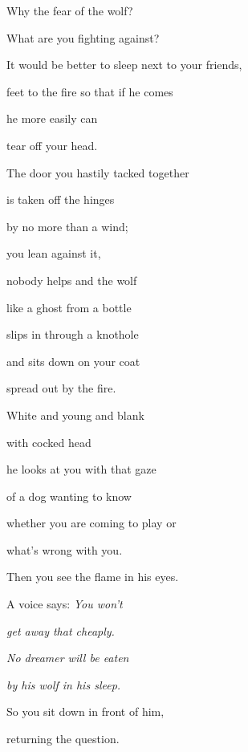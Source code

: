 \documentclass[a4paper]{article}
\begin{document}
\bigskip

Why the fear of the wolf?

What are you fighting against?


\bigskip

It would be better to sleep next to your friends, 

feet to the fire so that if he comes 

he more easily can

tear off your head.


\bigskip

The door you hastily tacked together

is taken off the hinges

by no more than a wind;

you lean against it,

nobody helps and the wolf

like a ghost from a bottle

slips in through a knothole


\bigskip

and sits down on your coat

spread out by the fire.

White and young and blank

with cocked head

he looks at you with that gaze

of a dog wanting to know

whether you are coming to play or

what's wrong with you.


\bigskip

Then you see the flame in his eyes. 

A voice says: \textit{You won't }

{\itshape
get away that cheaply.}

{\itshape
No dreamer will be eaten }

{\itshape
by his wolf in his sleep.}


\bigskip

So you sit down in front of him,

returning the question.


\bigskip


\bigskip


\bigskip


\bigskip



\bigskip
\end{document}
